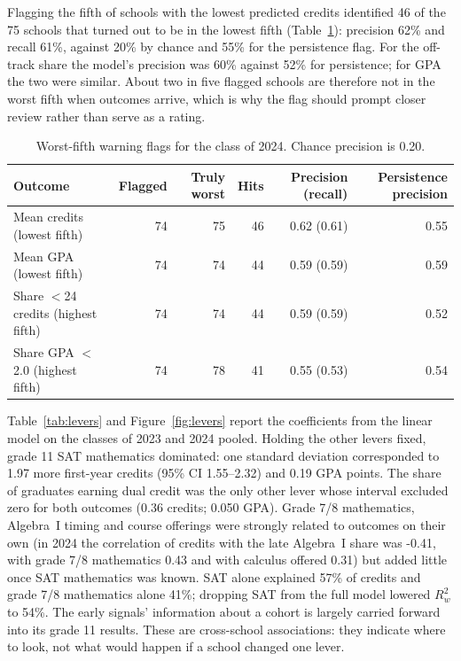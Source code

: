 \documentclass[11pt]{article}
\newcommand{\subsec}[1]{\par\vspace{1.6ex}\noindent{\large\bfseries #1}\par\vspace{0.8ex}\noindent\ignorespaces}
\begin{document}
\subsec{Warning flags}
Flagging the fifth of schools with the lowest predicted credits identified 46 of the 75 schools that turned out to be in the lowest fifth (Table~\ref{tab:flags}): precision 62\% and recall 61\%, against 20\% by chance and 55\% for the persistence flag. For the off-track share the model's precision was 60\% against 52\% for persistence; for GPA the two were similar. About two in five flagged schools are therefore not in the worst fifth when outcomes arrive, which is why the flag should prompt closer review rather than serve as a rating.

\begin{table}[t]
\centering
\caption{Worst-fifth warning flags for the class of 2024. Chance precision is 0.20.}\label{tab:flags}
\small
\begin{tabular}{@{}lrrrrr@{}}
\toprule
Outcome & Flagged & Truly worst & Hits & Precision (recall) & Persistence precision \\
\midrule
Mean credits (lowest fifth) & 74 & 75 & 46 & 0.62 (0.61) & 0.55 \\
Mean GPA (lowest fifth) & 74 & 74 & 44 & 0.59 (0.59) & 0.59 \\
Share $<$24 credits (highest fifth) & 74 & 74 & 44 & 0.59 (0.59) & 0.52 \\
Share GPA $<$2.0 (highest fifth) & 74 & 78 & 41 & 0.55 (0.53) & 0.54 \\
\bottomrule
\end{tabular}
\end{table}

\subsec{Which levers carry the signal}
Table~\ref{tab:levers} and Figure~\ref{fig:levers} report the coefficients from the linear model on the classes of 2023 and 2024 pooled. Holding the other levers fixed, grade 11 SAT mathematics dominated: one standard deviation corresponded to 1.97 more first-year credits (95\% CI 1.55--2.32) and 0.19 GPA points. The share of graduates earning dual credit was the only other lever whose interval excluded zero for both outcomes (0.36 credits; 0.050 GPA). Grade 7/8 mathematics, Algebra~I timing and course offerings were strongly related to outcomes on their own (in 2024 the correlation of credits with the late Algebra~I share was -0.41, with grade 7/8 mathematics 0.43 and with calculus offered 0.31) but added little once SAT mathematics was known. SAT alone explained 57\% of credits and grade 7/8 mathematics alone 41\%; dropping SAT from the full model lowered $R^2_w$ to 54\%. The early signals' information about a cohort is largely carried forward into its grade 11 results. These are cross-school associations: they indicate where to look, not what would happen if a school changed one lever.
\end{document}
